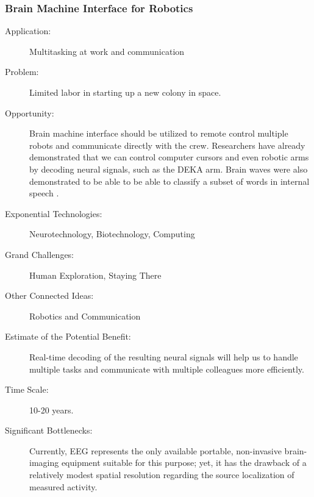 \subsubsection{Brain Machine Interface for Robotics}
\begin{description}  \item[Application:] Multitasking at work and communication
 
\item[Problem:] Limited labor in  starting up a new colony in space.
 
\item[Opportunity:] Brain machine interface should be utilized to remote control multiple robots and  communicate directly with the crew. Researchers have already  demonstrated that we can control computer cursors and even robotic arms by decoding neural signals, such as the DEKA arm. Brain waves were also  demonstrated to be able to be able to classify a subset of words in  internal speech \cite{Suppes1997}.
 
\item[Exponential Technologies:]  Neurotechnology, Biotechnology, Computing
 
\item[Grand Challenges:] Human Exploration, Staying There
 
\item[Other Connected Ideas:]  Robotics and Communication
 
\item[Estimate of the Potential  Benefit:]Real-time decoding of the resulting neural signals will help us  to handle multiple tasks and communicate with multiple colleagues more  efficiently.
 
\item[Time Scale:] 10-20 years.
 
\item[Significant Bottlenecks:]  Currently, EEG represents the only available portable, non-invasive  brain-imaging equipment suitable for this purpose; yet, it has the  drawback of a relatively modest spatial resolution regarding the source  localization of measured activity.
 
\end{description}

